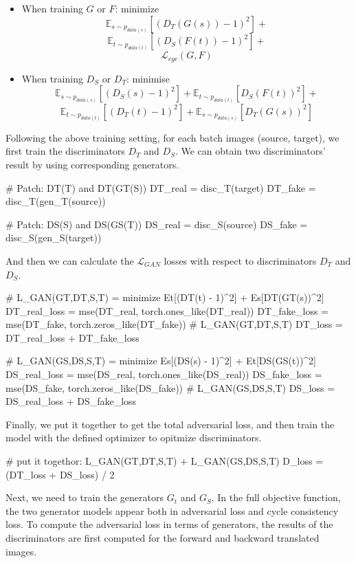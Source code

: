 \begin{itemize}
    \item When training $G$ or $F$: minimize 
    \[\mathbb{E}_{s \sim p_{data(s)}}[{(D_T(G(s)) - 1)}^2] +\] 
    \[\mathbb{E}_{t \sim p_{data(t)}}[{(D_S(F(t)) - 1)}^2] +\] 
    \[\mathcal{L}_{cyc}(G,F)\]
    \item When training $D_S$ or $D_T$: minimise 
    \[\mathbb{E}_{s \sim p_{data(s)}}[{(D_S(s) - 1)}^2] + \mathbb{E}_{t \sim p_{data(t)}}[{D_S(F(t))}^2] +\] 
    \[\mathbb{E}_{t \sim p_{data(t)}}[{(D_T(t) - 1)}^2] + \mathbb{E}_{s \sim p_{data(s)}}[{D_T(G(s))}^2]\]
\end{itemize}

Following the above training setting, for each batch images (source, target), we first train the discriminators $D_T$ and $D_S$. We can obtain two discriminators' result by using corresponding generators.

\begin{python}
# Patch: DT(T) and DT(GT(S))
DT_real = disc_T(target)
DT_fake = disc_T(gen_T(source))

# Patch: DS(S) and DS(GS(T))
DS_real = disc_S(source)
DS_fake = disc_S(gen_S(target))
\end{python}

And then we can calculate the $\mathcal{L}_{GAN}$ losses with respect to discriminators $D_T$ and $D_S$.

\begin{python}
# L_GAN(GT,DT,S,T) = minimize Et[(DT(t) - 1)^2] + Es[DT(GT(s))^2]
DT_real_loss = mse(DT_real, torch.ones_like(DT_real))
DT_fake_loss = mse(DT_fake, torch.zeros_like(DT_fake))
# L_GAN(GT,DT,S,T)
DT_loss = DT_real_loss + DT_fake_loss

# L_GAN(GS,DS,S,T) = minimize Es[(DS(s) - 1)^2] + Et[DS(GS(t))^2]
DS_real_loss = mse(DS_real, torch.ones_like(DS_real))
DS_fake_loss = mse(DS_fake, torch.zeros_like(DS_fake))
# L_GAN(GS,DS,S,T) 
DS_loss = DS_real_loss + DS_fake_loss
\end{python}

Finally, we put it together to get the total adversarial loss, and then train the model with the defined optimizer to opitmize discriminators.

\begin{python}
# put it togethor: L_GAN(GT,DT,S,T) + L_GAN(GS,DS,S,T) 
D_loss = (DT_loss + DS_loss) / 2
\end{python}

Next, we need to train the generators $G_t$ and $G_S$. In the full objective function, the two generator models appear both in adversarial loss and cycle consistency loss. To compute the adversarial loss in terms of generators, the results of the discriminators are first computed for the forward and backward translated images.

